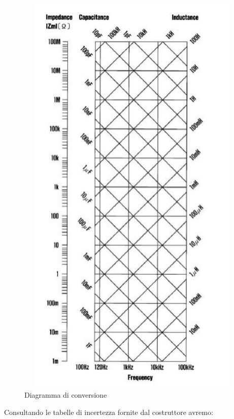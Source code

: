\begin{figure}[H]
    \centering
    \includegraphics[height=20cm, width=12cm]{media/diagramma_conversione_Cp.png}
    \caption{Diagramma di conversione}
    \label{fig:diag_conv_Cp}
\end{figure}
\FloatBarrier
\clearpage

Consultando le tabelle di incertezza fornite dal costruttore avremo:

